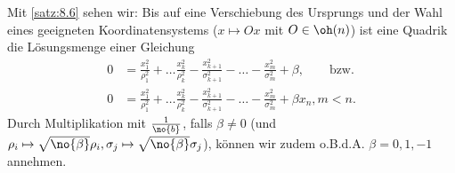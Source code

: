 \begin{bemerkung}
	\label{bem:8.8}
	Mit \autoref{satz:8.6} sehen wir:
	Bis auf eine Verschiebung des Ursprungs und der Wahl eines geeigneten Koordinatensystems ($x \mapsto Ox$ mit $O \in \oh(n)$) ist eine Quadrik die Lösungsmenge einer Gleichung
	\begin{align*}
		0 &= \frac{x_1^2}{\rho_1^2} + \dots \frac{x_k^2}{\rho_k^2} - \frac{x_{k+1}^2}{\sigma_{k+1}^2} - \dots - \frac{x_m^2}{\sigma_m^2} + \beta, \qquad \text{bzw.} \\
		0 &= \frac{x_1^2}{\rho_1^2} + \dots \frac{x_k^2}{\rho_k^2} - \frac{x_{k+1}^2}{\sigma_{k+1}^2} - \dots - \frac{x_m^2}{\sigma_m^2} + \beta x_n, m < n.
	\end{align*}
	Durch Multiplikation mit $\frac{1}{\no{b}}$, falls $\beta \neq 0$ (und $\rho_i \mapsto \sqrt{\no{\beta}} \rho_i, \sigma_j \mapsto \sqrt{\no{\beta}} \sigma_j$), können wir zudem o.B.d.A. $\beta = 0, 1, -1$ annehmen.
\end{bemerkung}

